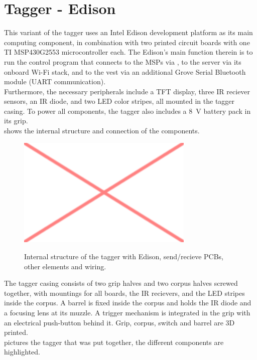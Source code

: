 \chapter{Tagger - Edison}
This variant of the tagger uses an Intel Edison development platform as its main computing component, in combination with two printed circuit boards with one TI MSP430G2553 microcontroller each. The Edison's main function therein is to run the control program that connects to the MSPs via \isqc, to the server via its onboard Wi-Fi stack, and to the vest via an additional Grove Serial Bluetooth module (UART communication).\\
Furthermore, the necessary peripherals include a  TFT display, three IR reciever sensors, an IR diode, and two LED color stripes, all mounted in the tagger casing. To power all components, the tagger also includes a \SI{8}{\volt} battery pack in its grip.\\
 shows the internal structure and connection of the components.

\begin{figure}[h!]
\centering
\includegraphics[width=0.75\textwidth]{images/placeholder.png}\\
\caption[Edison Tagger Structure]{Internal structure of the tagger with Edison, send/recieve PCBs, other elements and wiring.}
\label{fig:tag_ed_structure}
\end{figure}

The tagger casing consists of two grip halves and two corpus halves screwed together, with mountings for all boards, the IR recievers, and the LED stripes inside the corpus. A barrel is fixed inside the corpus and holds the IR diode and a focusing lens at its muzzle. A trigger mechanism is integrated in the grip with an electrical push-button behind it. Grip, corpus, switch and barrel are 3D printed.\\
 pictures the tagger that was put together, the different components are highlighted.

